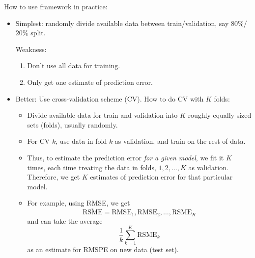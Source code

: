 How to use framework in practice:
\begin{itemize}
    \item Simplest: randomly divide available data
          between train/validation, say $ 80\% $/$ 20\% $ split.

          Weakness:
          \begin{enumerate}
              \item Don't use all data for training.
              \item Only get one estimate of prediction error.
          \end{enumerate}
    \item Better: Use cross-validation scheme (CV). How to
          do CV with $ K $ folds:
          \begin{figure}[!ht]
              \centering
          \end{figure}
          \begin{itemize}
              \item Divide available data for train and validation
                    into $ K $ roughly equally sized sets (folds),
                    usually randomly.
              \item For CV $ k $, use data in fold $ k $
                    as validation, and train on
                    the rest of data.
              \item Thus, to estimate the prediction error
                    \emph{for a given model}, we fit it $ K $ times, each
                    time treating the data in folds, $ 1,2,\ldots,K $
                    as validation.
                    Therefore, we get $ K $ estimates of prediction error
                    for that particular model.
              \item For example, using RMSE, we get
                    \[ \overline{\text{RSME}}
                        =\text{RMSE}_1,\text{RMSE}_2,\ldots,\text{RSME}_K \]
                    and can take the average
                    \[ \frac{1}{k} \sum_{k=1}^{K}\text{RSME}_k \]
                    as an estimate for RMSPE on new data (test set).
          \end{itemize}
\end{itemize}
